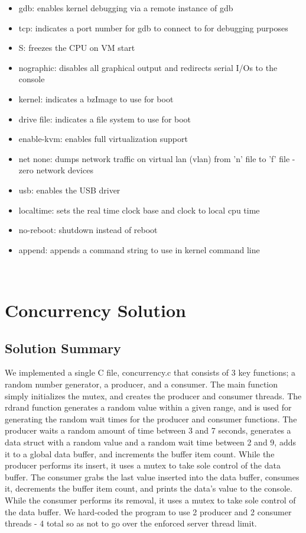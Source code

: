 \documentclass[onecolumn, draftclsnofoot,10pt, compsoc]{IEEEtran}
\begin{document}
\begin{itemize}

\item gdb:  enables kernel debugging via a remote instance of gdb
\item tcp:  indicates a port number for gdb to connect to for debugging purposes
\item S:  freezes the CPU on VM start
\item nographic:  disables all graphical output and redirects serial I/Os to the console
\item kernel:  indicates a bzImage to use for boot
\item drive file:  indicates a file system to use for boot
\item enable-kvm: enables full virtualization support
\item net none:  dumps network traffic on virtual lan (vlan) from 'n' file to 'f' file - zero network devices
\item usb:  enables the USB driver
\item localtime:  sets the real time clock base and clock to local cpu time
\item no-reboot:  shutdown instead of reboot
\item append:  appends a command string to use in kernel command line 

\end{itemize}

\noindent 
\\


\section{Concurrency Solution}

\subsection{Solution Summary}

\noindent
We implemented a single C file, concurrency.c that consists of 3 key functions; a random number generator, a producer, and a consumer. The main function simply initializes the mutex, and creates the producer and consumer threads. The rdrand function generates a random value within a given range, and is used for generating the random wait times for the producer and consumer functions. The producer waits a random amount of time between 3 and 7 seconds, generates a data struct with a random value and a random wait time between 2 and 9, adds it to a global data buffer, and increments the buffer item count. While the producer performs its insert, it uses a mutex to take sole control of the data buffer. The consumer grabs the last value inserted into the data buffer, consumes it, decrements the buffer item count, and prints the data's value to the console. While the consumer performs its removal, it uses a mutex to take sole control of the data buffer. We hard-coded the program to use 2 producer and 2 consumer threads - 4 total so as not to go over the enforced server thread limit. 
\\
\end{document}
